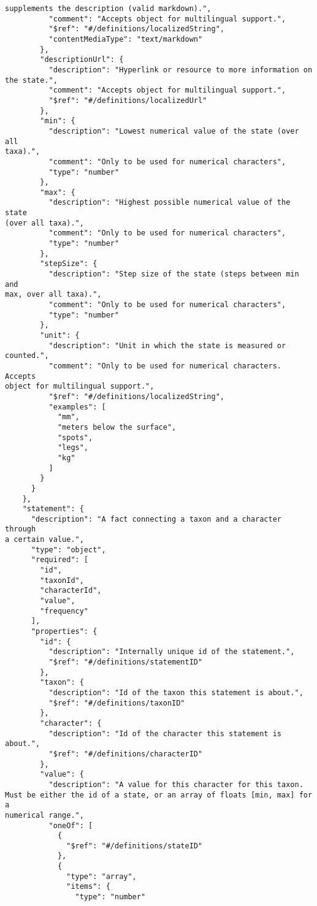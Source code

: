 \documentclass[10pt,letterpaper]{article}
\begin{document}
\begin{verbatim}
supplements the description (valid markdown).",
          "comment": "Accepts object for multilingual support.",
          "$ref": "#/definitions/localizedString",
          "contentMediaType": "text/markdown"
        },
        "descriptionUrl": {
          "description": "Hyperlink or resource to more information on
the state.",
          "comment": "Accepts object for multilingual support.",
          "$ref": "#/definitions/localizedUrl"
        },
        "min": {
          "description": "Lowest numerical value of the state (over all
taxa).",
          "comment": "Only to be used for numerical characters",
          "type": "number"
        },
        "max": {
          "description": "Highest possible numerical value of the state
(over all taxa).",
          "comment": "Only to be used for numerical characters",
          "type": "number"
        },
        "stepSize": {
          "description": "Step size of the state (steps between min and
max, over all taxa).",
          "comment": "Only to be used for numerical characters",
          "type": "number"
        },
        "unit": {
          "description": "Unit in which the state is measured or
counted.",
          "comment": "Only to be used for numerical characters. Accepts
object for multilingual support.",
          "$ref": "#/definitions/localizedString",
          "examples": [
            "mm",
            "meters below the surface",
            "spots",
            "legs",
            "kg"
          ]
        }
      }
    },
    "statement": {
      "description": "A fact connecting a taxon and a character through
a certain value.",
      "type": "object",
      "required": [
        "id",
        "taxonId",
        "characterId",
        "value",
        "frequency"
      ],
      "properties": {
        "id": {
          "description": "Internally unique id of the statement.",
          "$ref": "#/definitions/statementID"
        },
        "taxon": {
          "description": "Id of the taxon this statement is about.",
          "$ref": "#/definitions/taxonID"
        },
        "character": {
          "description": "Id of the character this statement is
about.",
          "$ref": "#/definitions/characterID"
        },
        "value": {
          "description": "A value for this character for this taxon.
Must be either the id of a state, or an array of floats [min, max] for a
numerical range.",
          "oneOf": [
            {
              "$ref": "#/definitions/stateID"
            },
            {
              "type": "array",
              "items": {
                "type": "number"

\end{verbatim}
\end{document}
